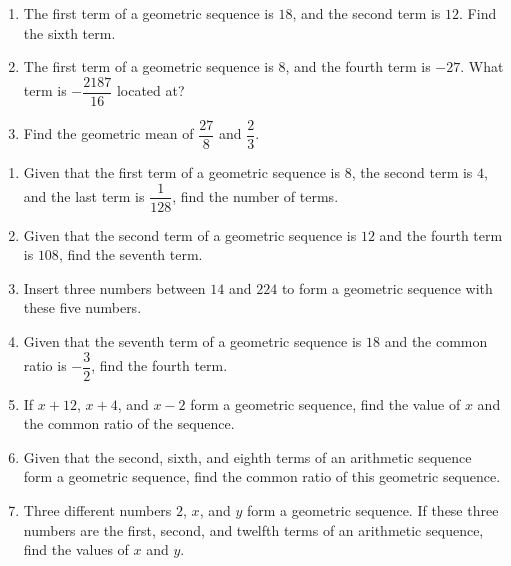 \documentclass{report}
\begin{document}
        \vspace{-2em}
        \begin{enumerate}
            \item The first term of a geometric sequence is $18$, and the second term is $12$. Find the sixth term.

            \item The first term of a geometric sequence is $8$, and the fourth term is $-27$. What term is $-\dfrac{2187}{16}$ located at?
            
            \item Find the geometric mean of $\dfrac{27}{8}$ and $\dfrac{2}{3}$.
        \end{enumerate}

        \vspace{-1em}
        \begin{enumerate}
            \item Given that the first term of a geometric sequence is $8$, the second term is $4$, and the last term is $\dfrac{1}{128}$, find the number of terms.

            \item  Given that the second term of a geometric sequence is $12$ and the fourth term is $108$, find the seventh term.
            
            \item Insert three numbers between $14$ and $224$ to form a geometric sequence with these five numbers.
            
            \item Given that the seventh term of a geometric sequence is $18$ and the common ratio is $-\dfrac{3}{2}$, find the fourth term.
            
            \item If $x+12$, $x+4$, and $x-2$ form a geometric sequence, find the value of $x$ and the common ratio of the sequence.
            
            \item Given that the second, sixth, and eighth terms of an arithmetic sequence form a geometric sequence, find the common ratio of this geometric sequence.
            
            \item Three different numbers $2$, $x$, and $y$ form a geometric sequence. If these three numbers are the first, second, and twelfth terms of an arithmetic sequence, find the values of $x$ and $y$.
        \end{enumerate}
\end{document}
